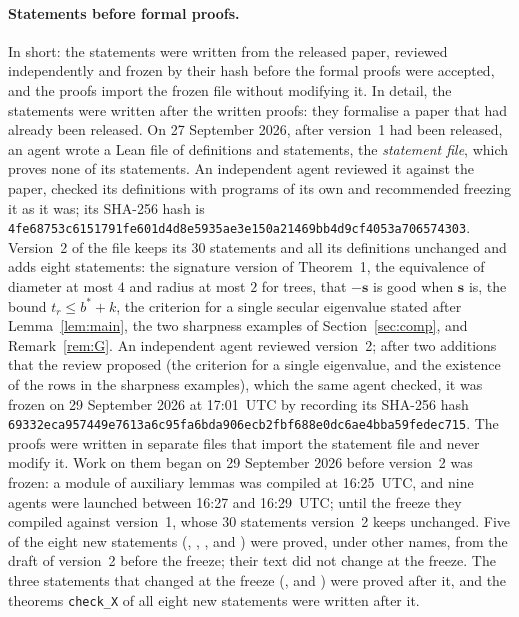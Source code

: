 \documentclass[11pt]{article}
\numberwithin{equation}{section}
\theoremstyle{remark}
\newcommand{\s}{\mathbf s}
\begin{document}
\paragraph{Statements before formal proofs.}
In short: the statements were written from the released paper, reviewed
independently and frozen by their hash before the formal proofs were accepted,
and the proofs import the frozen file without modifying it. In detail, the
statements were written after the written proofs: they formalise a
paper that had already been released. On 27 September 2026, after version~1
had been released, an agent wrote a Lean file of definitions and statements,
the \emph{statement file}, which proves none of its statements. An independent
agent reviewed it against the paper, checked its definitions with programs of
its own and recommended freezing it as it was; its SHA-256 hash is
\texttt{4fe68753c6151791fe601d4d8e5935ae\allowbreak 3e150a21469bb4d9cf4053a706574303}.
Version~2 of the file keeps its
$30$ statements and all its definitions unchanged and adds eight statements:
the signature version of Theorem~1, the equivalence of diameter at most $4$ and
radius at most $2$ for trees, that $-\s$ is good when $\s$ is, the bound
$t_r\le b^*+k$, the criterion for a single secular eigenvalue stated after
Lemma~\ref{lem:main}, the two sharpness examples of Section~\ref{sec:comp}, and
Remark~\ref{rem:G}. An independent agent reviewed version~2; after two
additions that the review proposed (the criterion for a single eigenvalue, and
the existence of the rows in the sharpness examples), which the same agent
checked, it was frozen
on 29 September 2026 at 17:01~UTC by recording its SHA-256 hash
\texttt{69332eca957449e7613a6c95fa6bda90\allowbreak 6ecb2fbf688e0dc6ae4bba59fedec715}.
The proofs were written in separate files that import the statement file and
never modify it. Work on them began on 29 September 2026 before version~2 was
frozen: a module of auxiliary lemmas was compiled at 16:25~UTC, and nine agents
were launched between 16:27 and 16:29~UTC; until the freeze they compiled
against version~1, whose $30$ statements version~2 keeps unchanged. Five of the
eight new statements (, , ,
 and ) were proved, under other names,
from the draft of version~2 before the freeze; their text did not change at the
freeze. The three statements that changed at the freeze
(,  and ) were
proved after it,
and the theorems \texttt{check\_X} of all eight new statements were written
after it.
\end{document}
